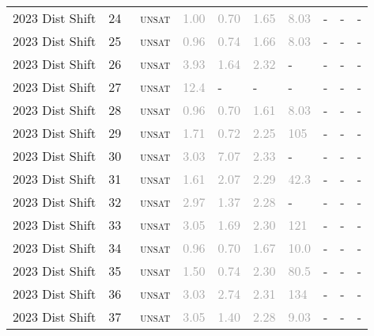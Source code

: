 \begin{center}
{\begin{longtable}{@{}llllllllll@{}}
2023 Dist Shift & 24 & ~\textsc{unsat} & \textcolor{darkgray}{1.00} & \textcolor{darkgray}{0.70} & \textcolor{darkgray}{1.65} & \textcolor{darkgray}{8.03} & - & - & - \\
2023 Dist Shift & 25 & ~\textsc{unsat} & \textcolor{darkgray}{0.96} & \textcolor{darkgray}{0.74} & \textcolor{darkgray}{1.66} & \textcolor{darkgray}{8.03} & - & - & - \\
2023 Dist Shift & 26 & ~\textsc{unsat} & \textcolor{darkgray}{3.93} & \textcolor{darkgray}{1.64} & \textcolor{darkgray}{2.32} & - & - & - & - \\
2023 Dist Shift & 27 & ~\textsc{unsat} & \textcolor{darkgray}{12.4} & - & - & - & - & - & - \\
2023 Dist Shift & 28 & ~\textsc{unsat} & \textcolor{darkgray}{0.96} & \textcolor{darkgray}{0.70} & \textcolor{darkgray}{1.61} & \textcolor{darkgray}{8.03} & - & - & - \\
2023 Dist Shift & 29 & ~\textsc{unsat} & \textcolor{darkgray}{1.71} & \textcolor{darkgray}{0.72} & \textcolor{darkgray}{2.25} & \textcolor{darkgray}{105} & - & - & - \\
2023 Dist Shift & 30 & ~\textsc{unsat} & \textcolor{darkgray}{3.03} & \textcolor{darkgray}{7.07} & \textcolor{darkgray}{2.33} & - & - & - & - \\
2023 Dist Shift & 31 & ~\textsc{unsat} & \textcolor{darkgray}{1.61} & \textcolor{darkgray}{2.07} & \textcolor{darkgray}{2.29} & \textcolor{darkgray}{42.3} & - & - & - \\
2023 Dist Shift & 32 & ~\textsc{unsat} & \textcolor{darkgray}{2.97} & \textcolor{darkgray}{1.37} & \textcolor{darkgray}{2.28} & - & - & - & - \\
2023 Dist Shift & 33 & ~\textsc{unsat} & \textcolor{darkgray}{3.05} & \textcolor{darkgray}{1.69} & \textcolor{darkgray}{2.30} & \textcolor{darkgray}{121} & - & - & - \\
2023 Dist Shift & 34 & ~\textsc{unsat} & \textcolor{darkgray}{0.96} & \textcolor{darkgray}{0.70} & \textcolor{darkgray}{1.67} & \textcolor{darkgray}{10.0} & - & - & - \\
2023 Dist Shift & 35 & ~\textsc{unsat} & \textcolor{darkgray}{1.50} & \textcolor{darkgray}{0.74} & \textcolor{darkgray}{2.30} & \textcolor{darkgray}{80.5} & - & - & - \\
2023 Dist Shift & 36 & ~\textsc{unsat} & \textcolor{darkgray}{3.03} & \textcolor{darkgray}{2.74} & \textcolor{darkgray}{2.31} & \textcolor{darkgray}{134} & - & - & - \\
2023 Dist Shift & 37 & ~\textsc{unsat} & \textcolor{darkgray}{3.05} & \textcolor{darkgray}{1.40} & \textcolor{darkgray}{2.28} & \textcolor{darkgray}{9.03} & - & - & - \\

\end{longtable}}
\end{center}
